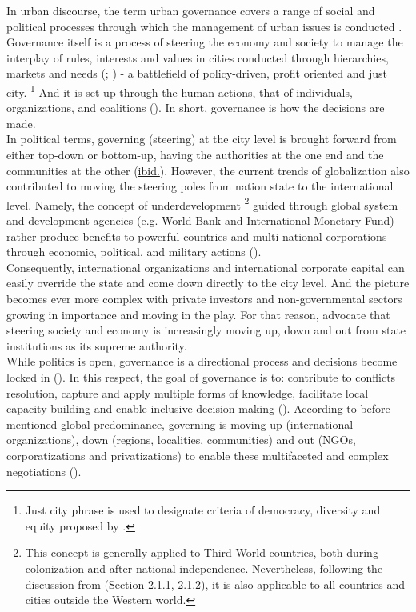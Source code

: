 \documentclass[11pt]{report}
\begin{document}
In urban discourse, the term urban governance covers a range of social and political processes through which the management of urban issues is conducted \href{Healey}{\citealt{healey_collaborative_1997}}.
Governance itself is a process of steering the economy and society to manage the interplay of rules, interests and values in cities conducted through hierarchies, markets and needs (\href{Pierre}{\citealt{pierre_debating_2000}}; \href{Pierre}{\citealt{pierre_governance_2000}}) - a battlefield of policy-driven, profit oriented and just city.
\footnote{Just city phrase is used to designate criteria of democracy, diversity and equity proposed by \cite{Farnstein (Just city)}.}
And it is set up through the human actions, that of individuals, organizations, and coalitions (\href{Hudson}{\citealt{hudson_political_2014}}).
In short, governance is how the decisions are made.
\\

In political terms, governing (steering) at the city level is brought forward from either top-down or bottom-up, having the authorities at the one end and the communities at the other (\href{Hudson}{ibid.}).
However, the current trends of globalization also contributed to moving the steering poles from nation state to the international level.
Namely, the concept of underdevelopment
\footnote{This concept is generally applied to Third World countries, both during colonization and after national independence. Nevertheless, following the discussion from (\href{Section 2.1.1}{Section 2.1.1}, \href{Section 2.1.2}{2.1.2}), it is also applicable to all countries and cities outside the Western world.}
guided through global system and development agencies (e.g. World Bank and International Monetary Fund) rather produce benefits to powerful countries and multi-national corporations through economic, political, and military actions (\cite{Sears 2008}).
\\

Consequently, international organizations and international corporate capital can easily override the state and come down directly to the city level.
And the picture becomes ever more complex with private investors and non-governmental sectors growing in importance and moving in the play.
For that reason, \href{Pierre}{\citealt{pierre_governance_2000}} advocate that steering society and economy is increasingly moving up, down and out from  state institutions as its supreme authority.
\\

While politics is open, governance is a directional process and decisions become locked in (\href{Hudson}{\citealt{hudson_political_2014}}).
In this respect, the goal of governance is to: contribute to conflicts resolution, capture and apply multiple  forms  of  knowledge, facilitate local capacity building and enable inclusive decision-making (\href{Mathur}{\citealt{mathur_defining_2007}}).
According to before mentioned global predominance, governing is moving up (international organizations), down (regions, localities, communities) and out (NGOs, corporatizations and privatizations) to enable these multifaceted and complex negotiations (\href{Pierre}{\citealt{pierre_governance_2000}}).
\\
\end{document}
